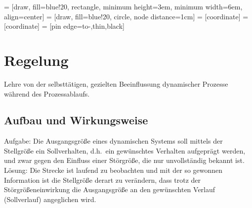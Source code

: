 

 = [draw, fill=blue!20, rectangle, 
    minimum height=3em, minimum width=6em, align=center]
 = [draw, fill=blue!20, circle, node distance=1cm]
 = [coordinate]
 = [coordinate]
 = [pin edge={to-,thin,black}]

\section{Regelung}%
\label{reg:sec:regelung}
Lehre von der selbsttätigen, gezielten Beeinflussung dynamischer Prozesse während des Prozessablaufs.

\subsection{Aufbau und Wirkungsweise}%
\label{reg:sub:aufbau-wirkungsweise}
Aufgabe: Die Ausgangsgröße eines dynamischen Systems soll mittels der Stellgröße ein Sollverhalten, d.h.\ ein
gewünschtes Verhalten aufgeprägt werden, und zwar gegen den Einfluss einer Störgröße, die nur unvollständig bekannt
ist.\\

Lösung: Die Strecke ist laufend zu beobachten und mit der so gewonnen Information ist die Stellgröße derart zu
verändern, dass trotz der Störgrößeneinwirkung die Ausgangsgröße an den gewünschten Verlauf (Sollverlauf)
angeglichen wird.\\

